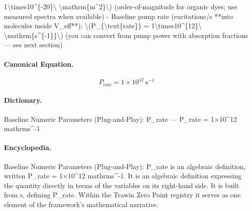 1\textbackslash{}times10\textasciicircum{}\{-20\}\textbackslash{} \textbackslash{}mathrm\{m\textasciicircum{}2\}\textbackslash{}) (order-of-magnitude for organic dyes; use measured spectra when available) - Baseline pump rate (excitations/s **into molecules inside V\_eff**): \textbackslash{}(P\_\{\textbackslash{}text\{rate\}\} = 1\textbackslash{}times10\textasciicircum{}\{12\}\textbackslash{} \textbackslash{}mathrm\{s\textasciicircum{}\{-1\}\}\textbackslash{}) (you can convert from pump power with absorption fractions — see next section)

\paragraph{Canonical Equation.}
\[
P_{\text{rate}} = 1\times10^{12}\ \mathrm{s^{-1}}
\]

\paragraph{Dictionary.}
Baseline Numeric Parameters (Plug-and-Play): P\_rate — P\_rate = 1×10\textasciicircum{}12 mathrms\textasciicircum{}-1

\paragraph{Encyclopedia.}
Baseline Numeric Parameters (Plug-and-Play): P\_rate is an algebraic definition, written P\_rate = 1×10\textasciicircum{}12 mathrms\textasciicircum{}-1. It is an algebraic definition expressing the quantity directly in terms of the variables on its right-hand side. It is built from s, defining P\_rate. Within the Trawin Zero Point registry it serves as one element of the framework's mathematical narrative.
